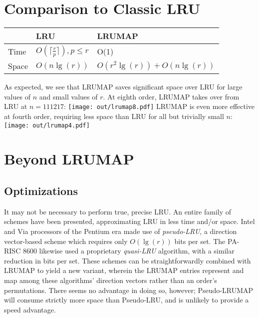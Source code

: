 \documentclass[letterpaper,10pt]{article}
\makeatletter
\newenvironment{figurehere}
{\def\@captype{figure}}
{}
\makeatother
\begin{document}
\begin{multicols}{2}
\section{Comparison to Classic LRU}
\begin{center}
\begin{tabular}{|l|l|l|}
\hline
 & LRU & LRUMAP \\
\hline
Time & $O(\lceil\frac{r}{p}\rceil), {p}\le{r}$ & O(1) \\
\hline
Space & $O(n\lg{(r)})$ & $O(r^{2}\lg{(r)}) + O(n\lg{(r)})$ \\
\hline
\end{tabular}
\end{center}
As expected, we see that LRUMAP saves significant space over LRU for large
values of $n$ and small values of $r$. At eighth order, LRUMAP takes over
from LRU at $n=111217$:
\begin{figurehere}
	\centering
	\texttt{[image: out/lrumap8.pdf]}
\end{figurehere}
LRUMAP is even more effective at fourth order, requiring less space than LRU
for all but trivially small $n$:
\begin{figurehere}
	\centering
	\texttt{[image: out/lrumap4.pdf]}
\end{figurehere}
\section{Beyond LRUMAP}
\subsection{Optimizations}
It may not be necessary to perform true, precise LRU. An entire family of
schemes have been presented, approximating LRU in less time and/or space.
Intel\cite{shanley} and Via processors of the Pentium era made use of
\textit{pseudo-LRU}, a direction vector-based scheme which requires only
$O(\lg{(r)})$ bits per set\cite{handy}. The PA-RISC 8600\cite{hurd} likewise used
a proprietary \textit{quasi-LRU} algorithm, with a similar reduction in bits
per set. These schemes can be straightforwardly combined with LRUMAP to yield a
new variant, wherein the LRUMAP entries represent and map among these
algorithms' direction vectors rather than an order's permutations. There seems
no advantage in doing so, however; Pseudo-LRUMAP will consume strictly more space
than Pseudo-LRU, and is unlikely to provide a speed advantage.


\end{multicols}
\end{document}
